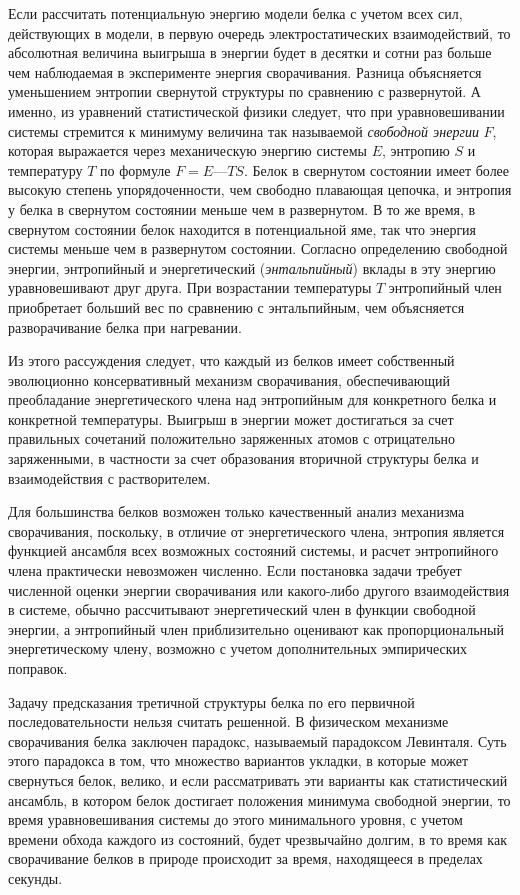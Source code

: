 Если рассчитать потенциальную энергию модели белка с учетом всех сил, действующих в модели, в первую очередь электростатических взаимодействий, то абсолютная величина выигрыша в энергии будет в десятки и сотни раз больше чем наблюдаемая в эксперименте энергия сворачивания. Разница объясняется уменьшением энтропии свернутой структуры по сравнению с развернутой. А именно, из уравнений статистической физики следует, что при уравновешивании системы стремится к минимуму величина так называемой \textit{свободной энергии} $F$, которая выражается через механическую энергию системы $E$, энтропию $S$ и температуру $T$ по формуле $F = E — TS$. Белок в свернутом состоянии имеет более высокую степень упорядоченности, чем свободно плавающая цепочка, и энтропия у белка в свернутом состоянии меньше чем в развернутом. В то же время, в свернутом состоянии белок находится в потенциальной яме, так что энергия системы меньше чем в развернутом состоянии. Согласно определению свободной энергии, энтропийный и энергетический (\textit{энтальпийный}) вклады в эту энергию уравновешивают друг друга. При возрастании температуры $T$ энтропийный член приобретает больший вес по сравнению с энтальпийным, чем объясняется разворачивание белка при нагревании.

Из этого рассуждения следует, что каждый из белков имеет собственный эволюционно консервативный механизм сворачивания, обеспечивающий преобладание энергетического члена над энтропийным для конкретного белка и конкретной температуры. Выигрыш в энергии может достигаться за счет правильных сочетаний положительно заряженных атомов с отрицательно заряженными, в частности за счет образования вторичной структуры белка и взаимодействия с растворителем.

Для большинства белков возможен только качественный анализ механизма сворачивания, поскольку, в отличие от энергетического члена, энтропия является функцией ансамбля всех возможных состояний системы, и расчет энтропийного члена практически невозможен численно. Если постановка задачи требует численной оценки энергии сворачивания или какого-либо другого взаимодействия в системе, обычно рассчитывают энергетический член в функции свободной энергии, а энтропийный член приблизительно оценивают как пропорциональный энергетическому члену, возможно с учетом дополнительных эмпирических поправок. 

Задачу предсказания третичной структуры белка по его первичной последовательности нельзя считать решенной. В физическом механизме сворачивания белка заключен парадокс, называемый парадоксом Левинталя. 	Суть этого парадокса в том, что множество вариантов укладки, в которые может свернуться белок, велико, и если рассматривать эти варианты как статистический ансамбль, в котором белок достигает положения минимума свободной энергии, то время уравновешивания системы до этого минимального уровня, с учетом времени обхода каждого из состояний, будет чрезвычайно долгим, в то время как сворачивание белков в природе происходит за время, находящееся в пределах секунды.

